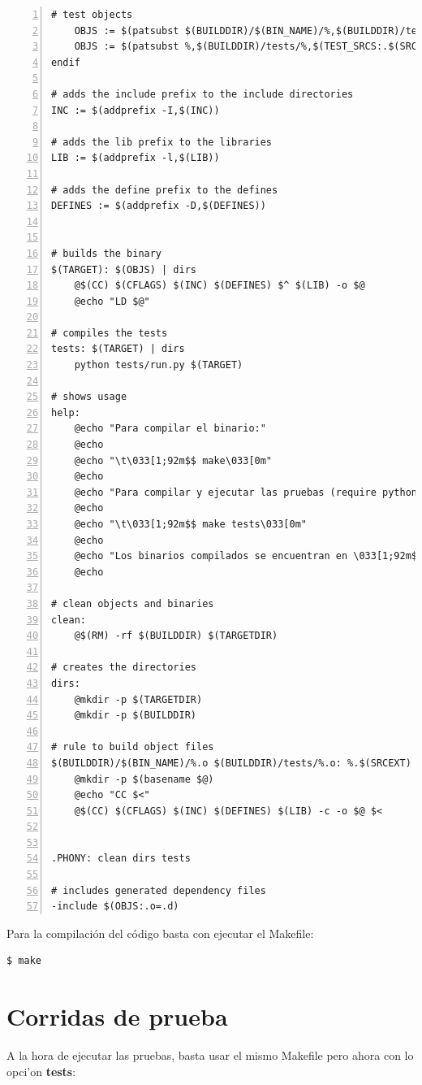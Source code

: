 \begin{tiny}
\begin{lstlisting}[numbers=left, tabsize=2, basicstyle=\fontsize{11}{13}\ttfamily, frame=single, caption={makefile}]
	# test objects
	OBJS := $(patsubst $(BUILDDIR)/$(BIN_NAME)/%,$(BUILDDIR)/tests/%,$(OBJS))
	OBJS := $(patsubst %,$(BUILDDIR)/tests/%,$(TEST_SRCS:.$(SRCEXT)=.o)) $(OBJS)
endif

# adds the include prefix to the include directories
INC := $(addprefix -I,$(INC))

# adds the lib prefix to the libraries
LIB := $(addprefix -l,$(LIB))

# adds the define prefix to the defines
DEFINES := $(addprefix -D,$(DEFINES))


# builds the binary
$(TARGET): $(OBJS) | dirs
	@$(CC) $(CFLAGS) $(INC) $(DEFINES) $^ $(LIB) -o $@
	@echo "LD $@"

# compiles the tests
tests: $(TARGET) | dirs
	python tests/run.py $(TARGET)

# shows usage
help:
	@echo "Para compilar el binario:"
	@echo
	@echo "\t\033[1;92m$$ make\033[0m"
	@echo
	@echo "Para compilar y ejecutar las pruebas (require python 2.7+ instalado):"
	@echo
	@echo "\t\033[1;92m$$ make tests\033[0m"
	@echo
	@echo "Los binarios compilados se encuentran en \033[1;92m$(TARGETDIR)\033[0m."
	@echo

# clean objects and binaries
clean:
	@$(RM) -rf $(BUILDDIR) $(TARGETDIR)

# creates the directories
dirs:
	@mkdir -p $(TARGETDIR)
	@mkdir -p $(BUILDDIR)

# rule to build object files
$(BUILDDIR)/$(BIN_NAME)/%.o $(BUILDDIR)/tests/%.o: %.$(SRCEXT)
	@mkdir -p $(basename $@)
	@echo "CC $<"
	@$(CC) $(CFLAGS) $(INC) $(DEFINES) $(LIB) -c -o $@ $<


.PHONY: clean dirs tests

# includes generated dependency files
-include $(OBJS:.o=.d)
\end{lstlisting}

\end{tiny}

Para la compilaci\'on del c\'odigo basta con ejecutar el Makefile:

\begin{lstlisting}
$ make 
\end{lstlisting}

\section{Corridas de prueba}

A la hora de ejecutar las pruebas, basta usar el mismo Makefile pero ahora con lo opci'on \textbf{tests}:

